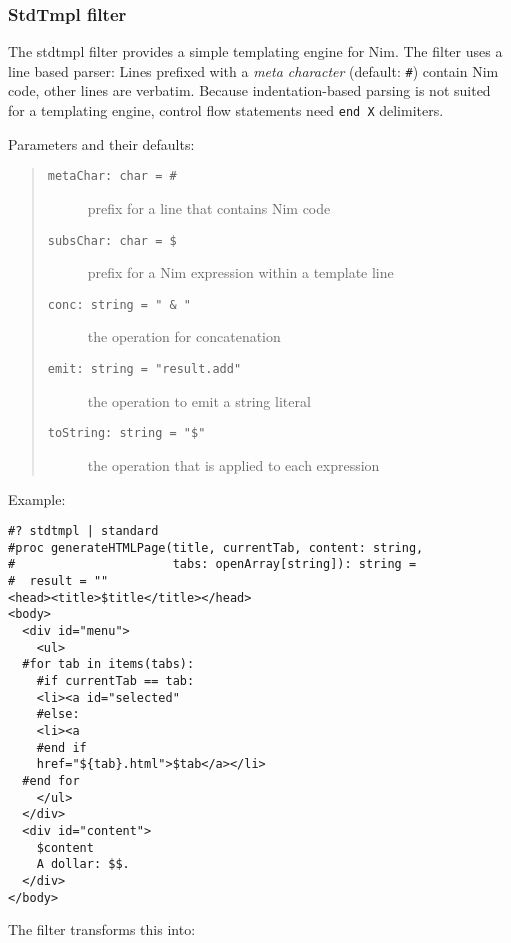 \hypertarget{stdtmpl-filter}{%
\subsubsection{StdTmpl filter}\label{stdtmpl-filter}}

The stdtmpl filter provides a simple templating engine for Nim. The
filter uses a line based parser: Lines prefixed with a \emph{meta
character} (default: \texttt{\#}) contain Nim code, other lines are
verbatim. Because indentation-based parsing is not suited for a
templating engine, control flow statements need \texttt{end\ X}
delimiters.

Parameters and their defaults:

\begin{quote}
\begin{description}
\item[\texttt{metaChar:\ char\ =\ \textquotesingle{}\#\textquotesingle{}}]
prefix for a line that contains Nim code
\item[\texttt{subsChar:\ char\ =\ \textquotesingle{}\$\textquotesingle{}}]
prefix for a Nim expression within a template line
\item[\texttt{conc:\ string\ =\ "\ \&\ "}]
the operation for concatenation
\item[\texttt{emit:\ string\ =\ "result.add"}]
the operation to emit a string literal
\item[\texttt{toString:\ string\ =\ "\$"}]
the operation that is applied to each expression
\end{description}
\end{quote}

Example:

\begin{verbatim}
#? stdtmpl | standard
#proc generateHTMLPage(title, currentTab, content: string,
#                      tabs: openArray[string]): string =
#  result = ""
<head><title>$title</title></head>
<body>
  <div id="menu">
    <ul>
  #for tab in items(tabs):
    #if currentTab == tab:
    <li><a id="selected"
    #else:
    <li><a
    #end if
    href="${tab}.html">$tab</a></li>
  #end for
    </ul>
  </div>
  <div id="content">
    $content
    A dollar: $$.
  </div>
</body>
\end{verbatim}

The filter transforms this into:

\begin{verbatim}
\end{verbatim}

